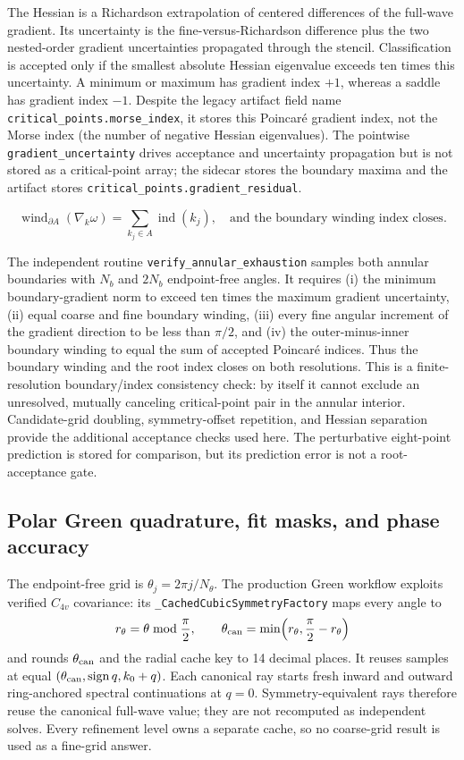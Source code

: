 The Hessian is a Richardson extrapolation of centered differences of the
full-wave gradient.  Its uncertainty is the fine-versus-Richardson
difference plus the two nested-order gradient uncertainties propagated
through the stencil.  Classification is accepted only if the smallest
absolute Hessian eigenvalue exceeds ten times this uncertainty.  A minimum
or maximum has gradient index \(+1\), whereas a saddle has gradient index
\(-1\).  Despite the legacy artifact field name
\texttt{critical\_points.morse\_index}, it stores this Poincar\'e gradient
index, not the Morse index (the number of negative Hessian eigenvalues).
The pointwise \texttt{gradient\_uncertainty} drives acceptance and uncertainty
propagation but is not stored as a critical-point array; the sidecar stores
the boundary maxima and the artifact stores
\texttt{critical\_points.gradient\_residual}.

\begin{equation}
 \operatorname{wind}_{\partial A}(\nabla_k\omega)
 =\sum_{k_j\in A}\operatorname{ind}(k_j),
 \quad\text{and the boundary winding index closes.}
 \label{eq:annular-index-certificate}
\end{equation}

The independent routine \texttt{verify\_annular\_exhaustion} samples both
annular boundaries with \(N_b\) and \(2N_b\) endpoint-free angles.  It
requires (i) the minimum boundary-gradient norm to exceed ten times the
maximum gradient uncertainty, (ii) equal coarse and fine boundary winding,
(iii) every fine angular increment of the gradient direction to be less than
\(\pi/2\), and (iv) the outer-minus-inner boundary winding to equal the sum
of accepted Poincar\'e indices.  Thus the boundary winding and the root index
closes on both resolutions.  This is a finite-resolution boundary/index
consistency check: by itself it cannot exclude an unresolved, mutually canceling
critical-point pair in the annular interior.  Candidate-grid doubling,
symmetry-offset repetition, and Hessian separation provide the additional
acceptance checks used here.  The perturbative eight-point prediction is
stored for comparison, but its prediction error is not a root-acceptance
gate.

\subsection{Polar Green quadrature, fit masks, and phase accuracy}

The endpoint-free grid is \(\theta_j=2\pi j/N_\theta\).  The production Green
workflow exploits verified \(C_{4v}\) covariance: its
\texttt{\_CachedCubicSymmetryFactory} maps every angle to
\[
 r_\theta=\theta\bmod\frac{\pi}{2},\qquad
 \theta_{\rm can}=\min\!\left(r_\theta,\frac{\pi}{2}-r_\theta\right)
\]
and rounds \(\theta_{\rm can}\) and the radial cache key to 14 decimal
places.  It reuses samples at equal
\((\theta_{\rm can},\operatorname{sign}q,k_0+q)\).  Each canonical ray starts
fresh inward and outward ring-anchored spectral continuations at \(q=0\).
Symmetry-equivalent rays therefore reuse the
canonical full-wave value; they are not recomputed as independent solves.
Every refinement level owns a separate cache, so no coarse-grid result is
used as a fine-grid answer.

